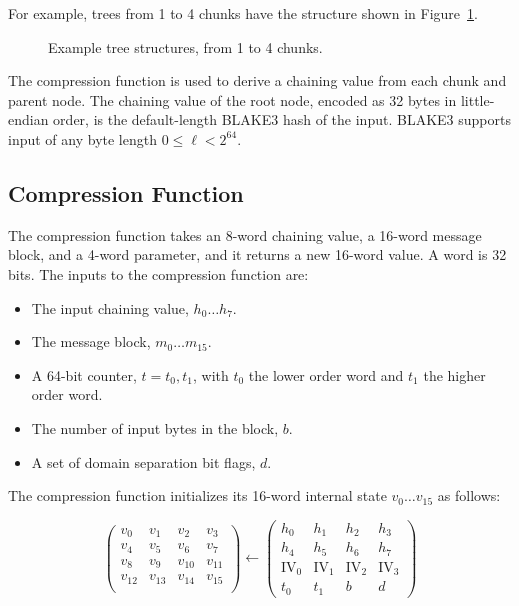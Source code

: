\documentclass[11pt,notitlepage,a4paper]{article}
\newcommand{\IV}{\text{IV}}
\begin{document}
For example, trees from 1 to 4 chunks have the structure shown in
Figure~\ref{fig:fourchunks}.

\begin{figure}[h]
\centering
 
\caption{Example tree structures, from 1 to 4 chunks.}
\label{fig:fourchunks}
\end{figure}

The compression function is used to derive a chaining value from each chunk and
parent node. The chaining value of the root node, encoded as 32 bytes in
little-endian order, is the default-length BLAKE3 hash of the input. BLAKE3
supports input of any byte length $0 \leq \ell < 2^{64}$.

\subsection{Compression Function}\label{sec:compression}

The compression function takes an 8-word chaining value, a 16-word message
block, and a 4-word parameter, and it returns a new 16-word value. A word is 32 bits. The inputs to
the compression function are:

\begin{itemize}
    \item The input chaining value, $h_{0} \ldots h_{7}$.
    \item The message block, $m_{0} \ldots m_{15}$.
    \item A 64-bit counter, $t=t_{0},t_{1}$, with $t_{0}$ the lower order word
        and $t_{1}$ the higher order word.
    \item The number of input bytes in the block, $b$.
    \item A set of domain separation bit flags, $d$.
\end{itemize}

The compression function initializes its 16-word internal state $v_{0} \ldots
v_{15}$ as follows: 

\begin{equation*}
\begin{pmatrix}
v_{0} & v_{1} & v_{2} & v_{3} \\
v_{4} & v_{5} & v_{6} & v_{7} \\
v_{8} & v_{9} & v_{10} & v_{11} \\
v_{12} & v_{13} & v_{14} & v_{15} \\
\end{pmatrix}
\leftarrow
\begin{pmatrix}
h_{0} & h_{1} & h_{2} & h_{3} \\
h_{4} & h_{5} & h_{6} & h_{7} \\
\IV_{0} & \IV_{1} & \IV_{2} & \IV_{3} \\
t_{0} & t_{1} & b & d 
\end{pmatrix}
\end{equation*}
\end{document}
